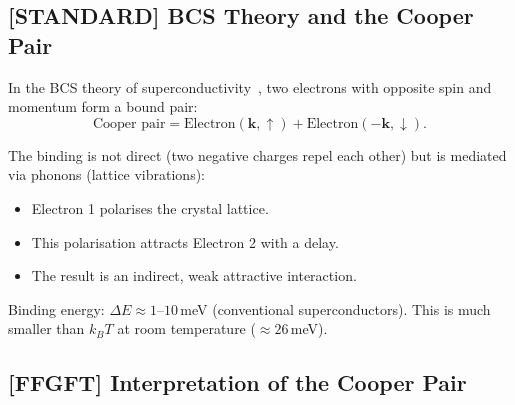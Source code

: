 \subsection{[STANDARD] BCS Theory and the Cooper Pair}

In the BCS theory of superconductivity~\cite{BCS1957,Cooper1956},
two electrons with opposite spin and momentum
form a bound pair:
\begin{equation}
  \text{Cooper pair} = \text{Electron}(\mathbf{k},\uparrow) +
  \text{Electron}(-\mathbf{k},\downarrow).
\end{equation}

The binding is not direct (two negative charges repel each other)
but is mediated via phonons (lattice vibrations):
\begin{itemize}
  \item Electron 1 polarises the crystal lattice.
  \item This polarisation attracts Electron 2 with a delay.
  \item The result is an indirect, weak attractive interaction.
\end{itemize}

Binding energy: $\Delta E \approx 1$--$10$\,meV
(conventional superconductors). This is much smaller than
$k_B T$ at room temperature ($\approx 26$\,meV).

\begin{center}
\end{center}

\subsection{[FFGFT] Interpretation of the Cooper Pair}

